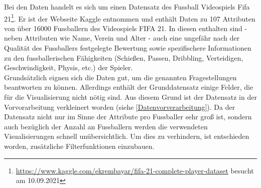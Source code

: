 \documentclass[usegeometry=true]{scrartcl}
\begin{document}
Bei den Daten handelt es sich um einen Datensatz des Fussball Videospiels Fifa 21\footnote{\url{https://www.kaggle.com/ekrembayar/fifa-21-complete-player-dataset} besucht am 10.09.2021}. Er ist der Webseite Kaggle entnommen und enthält Daten zu 107 Attributen von über 16000 Fussballern des Videospiels FIFA 21. In diesen enthalten sind - neben Attributen wie Name, Verein und Alter - auch eine ungefähr nach der Qualität des Fussballers festgelegte Bewertung sowie spezifischere Informationen zu den fussballerischen Fähigkeiten (Schießen, Passen, Dribbling, Verteidigen, Geschwindigkeit, Physis, etc.) der Spieler.\\
Grundsätzlich eignen sich die Daten gut, um die genannten Fragestellungen beantworten zu können. Allerdings enthält der Grunddatensatz einige Felder, die für die Visualisierung nicht nötig sind. Aus diesem Grund ist der Datensatz in der Vorvorarbeitung verkleinert worden (siehe \ref{Datenvorverarbeitung}). Da der Datensatz nicht nur im Sinne der Attribute pro Fussballer sehr groß ist, sondern auch bezüglich der Anzahl an Fussballern werden die verwendeten Visualisierungen schnell unübersichtlich. Um dies zu verhindern, ist entschieden worden, zusätzliche Filterfunktionen einzubauen. %
\end{document}
